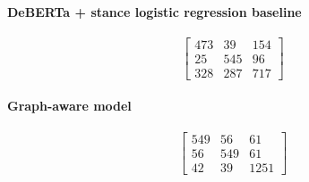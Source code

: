 \documentclass[11pt,a4paper]{article}
\begin{document}
\paragraph{DeBERTa + stance logistic regression baseline}
\[
\begin{bmatrix}
473 & 39 & 154 \\
25 & 545 & 96 \\
328 & 287 & 717
\end{bmatrix}
\]

\paragraph{Graph-aware model}
\[
\begin{bmatrix}
549 & 56 & 61 \\
56 & 549 & 61 \\
42 & 39 & 1251
\end{bmatrix}
\]
\end{document}
